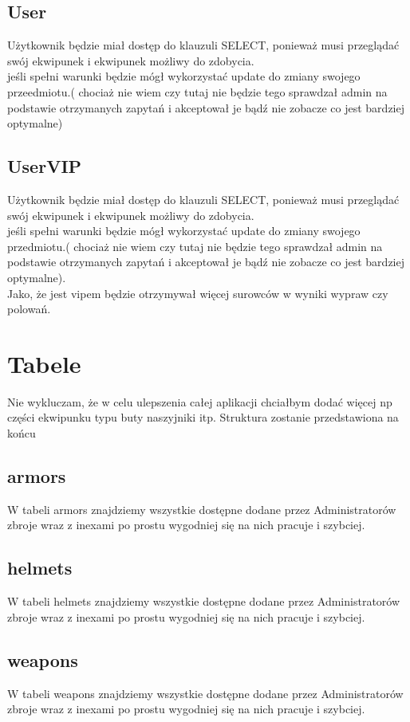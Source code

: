 \documentclass[11pt]{article}
\begin{document}
\begin{flushleft}
\subsection{User}
Użytkownik będzie miał dostęp do klauzuli SELECT, ponieważ musi przeglądać swój ekwipunek i ekwipunek możliwy do zdobycia.
\\ jeśli spełni warunki będzie mógł wykorzystać update do zmiany swojego przeedmiotu.( chociaż nie wiem czy tutaj nie będzie tego sprawdzał admin na podstawie otrzymanych zapytań i akceptował je bądź nie zobacze  co jest bardziej optymalne)

\subsection{UserVIP}
Użytkownik będzie miał dostęp do klauzuli SELECT, ponieważ musi przeglądać swój ekwipunek i ekwipunek możliwy do zdobycia.
\\ jeśli spełni warunki będzie mógł wykorzystać update do zmiany swojego przedmiotu.( chociaż nie wiem czy tutaj nie będzie tego sprawdzał admin na podstawie otrzymanych zapytań i akceptował je bądź nie zobacze  co jest bardziej optymalne).
\\Jako, że jest vipem będzie otrzymywał więcej surowców w wyniki wypraw czy polowań.

\section{Tabele}
Nie wykluczam, że w celu ulepszenia całej aplikacji chciałbym dodać więcej np części ekwipunku typu buty naszyjniki itp. Struktura zostanie przedstawiona na końcu 
\subsection{armors}
W tabeli armors znajdziemy wszystkie dostępne dodane przez Administratorów zbroje wraz z inexami po prostu wygodniej się na nich pracuje i szybciej. 
\subsection{helmets}
W tabeli helmets znajdziemy wszystkie dostępne dodane przez Administratorów zbroje wraz z inexami po prostu wygodniej się na nich pracuje i szybciej. 
\subsection{weapons}
W tabeli weapons znajdziemy wszystkie dostępne dodane przez Administratorów zbroje wraz z inexami po prostu wygodniej się na nich pracuje i szybciej. 

\end{flushleft}
\end{document}
